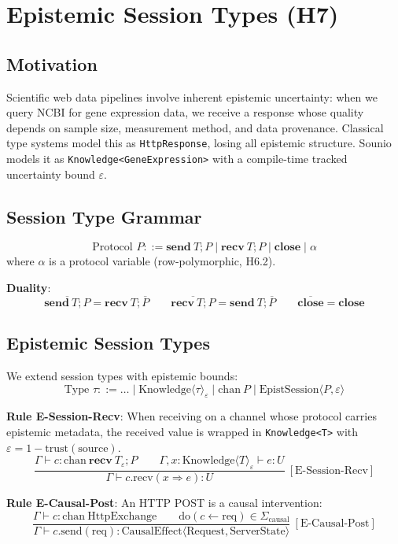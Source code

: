 \section{Epistemic Session Types (H7)}
\label{sec:epistemic-sessions}

\subsection{Motivation}
Scientific web data pipelines involve inherent epistemic uncertainty:
when we query NCBI for gene expression data, we receive a response
whose quality depends on sample size, measurement method, and data
provenance. Classical type systems model this as \texttt{HttpResponse},
losing all epistemic structure. Sounio models it as
\texttt{Knowledge<GeneExpression>} with a compile-time tracked
uncertainty bound $\varepsilon$.

\subsection{Session Type Grammar}
$$
\text{Protocol } P ::= \textbf{send}\ T; P \mid \textbf{recv}\ T; P \mid \textbf{close} \mid \alpha
$$
where $\alpha$ is a protocol variable (row-polymorphic, H6.2).

\textbf{Duality}:
$$
\overline{\textbf{send}\ T; P} = \textbf{recv}\ T; \overline{P}
\qquad
\overline{\textbf{recv}\ T; P} = \textbf{send}\ T; \overline{P}
\qquad
\overline{\textbf{close}} = \textbf{close}
$$

\subsection{Epistemic Session Types}
We extend session types with epistemic bounds:
$$
\text{Type } \tau ::= \ldots \mid \text{Knowledge}\langle\tau\rangle_\varepsilon \mid \text{chan}\ P
\mid \text{EpistSession}\langle P, \varepsilon \rangle
$$

\textbf{Rule E-Session-Recv}: When receiving on a channel whose protocol
carries epistemic metadata, the received value is wrapped in
\texttt{Knowledge<T>} with $\varepsilon = 1 - \text{trust}(\text{source})$.
$$
\frac{\Gamma \vdash c : \text{chan}\ \textbf{recv}\ T_\varepsilon; P
\qquad \Gamma, x : \text{Knowledge}\langle T \rangle_\varepsilon \vdash e : U}
{\Gamma \vdash c.\text{recv}(x \Rightarrow e) : U}\ [\text{E-Session-Recv}]
$$

\textbf{Rule E-Causal-Post}: An HTTP POST is a causal intervention:
$$
\frac{\Gamma \vdash c : \text{chan}\ \text{HttpExchange}
\qquad \text{do}(c \leftarrow \text{req}) \in \Sigma_\text{causal}}
{\Gamma \vdash c.\text{send}(\text{req}) : \text{CausalEffect}\langle\text{Request}, \text{ServerState}\rangle}\ [\text{E-Causal-Post}]
$$

